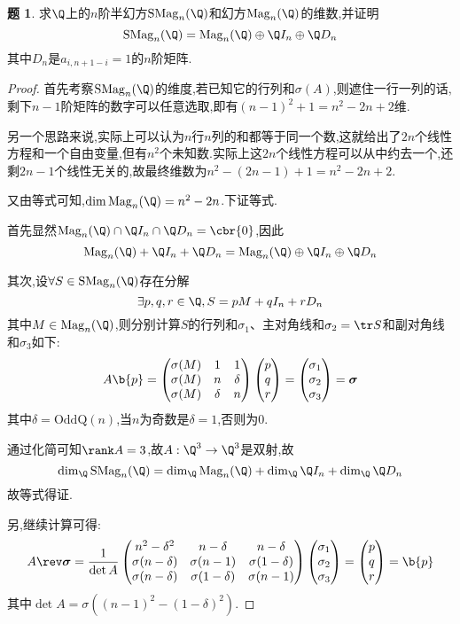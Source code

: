 \documentclass{article}
\newcommand{\Mag}{\mathrm{Mag}}
\newcommand{\SMag}{\mathrm{SMag}}
\theoremstyle{definition}
\newtheorem{exercise}{题}[section]
\begin{document}
\begin{exercise}
    求$\Q$上的$n$阶半幻方$\SMag_n(\Q)$和幻方$\Mag_n(\Q)$的维数,并证明$$\SMag_n(\Q)=\Mag_n(\Q)\oplus \Q I_n\oplus \Q D_n$$其中$D_n$是$a_{i,n+1-i}=1$的$n$阶矩阵.
\end{exercise}
\begin{proof}
    首先考察$\SMag_n(\Q)$的维度,若已知它的行列和$\sigma(A)$,则遮住一行一列的话,剩下$n-1$阶矩阵的数字可以任意选取,即有$(n-1)^2+1=n^2-2n+2$维.

    另一个思路来说,实际上可以认为$n$行$n$列的和都等于同一个数,这就给出了$2n$个线性方程和一个自由变量,但有$n^2$个未知数.实际上这$2n$个线性方程可以从中约去一个,还剩$2n-1$个线性无关的,故最终维数为$n^2-(2n-1)+1=n^2-2n+2$.

    又由等式可知,$\dim \Mag_n(\Q)=n^2-2n$.下证等式.

    首先显然$\Mag_n(\Q)\cap \Q I_n\cap \Q D_n=\cbr{0}$,因此$$\Mag_n(\Q)+ \Q I_n+ \Q D_n=\Mag_n(\Q)\oplus \Q I_n\oplus \Q D_n$$

    其次,设$\forall S\in \SMag_n(\Q)$存在分解$$\exists p,q,r\in \Q, S=pM+qI_n+rD_n$$其中$M\in \Mag_n(\Q)$,则分别计算$S$的行列和$\sigma_1$、主对角线和$\sigma_2=\tr S$和副对角线和$\sigma_3$如下:
    $$A\b{p}=\begin{pmatrix}
       \sigma(M)&1&1\\ \sigma(M)&n&\delta\\ \sigma(M)& \delta &n
    \end{pmatrix}\begin{pmatrix}
       p\\ q\\ r
    \end{pmatrix}=\begin{pmatrix}
       \sigma_1\\ \sigma_2\\ \sigma_3
    \end{pmatrix}=\bm{\sigma}$$
    其中$\delta=\mathrm{OddQ}(n)$,当$n$为奇数是$\delta=1$,否则为$0$.

    通过化简可知$\rank A=3$,故$A:\Q^3\to \Q^3$是双射,故
    $$\dim_\Q \SMag_n(\Q)=\dim_\Q \Mag_n(\Q)+ \dim_\Q \Q I_n + \dim_\Q \Q D_n$$
    故等式得证.

    另,继续计算可得:
    $$A\rev\bm{\sigma}=\frac{1}{\det A}\begin{pmatrix}
       n^2-\delta^2&n-\delta&n-\delta\\ 
       \sigma(n-\delta)&\sigma(n-1)&\sigma(1-\delta)\\
       \sigma(n-\delta)&\sigma(1-\delta)&\sigma(n-1)\\
    \end{pmatrix}\begin{pmatrix}
       \sigma_1\\ \sigma_2\\ \sigma_3
    \end{pmatrix}=\begin{pmatrix}
       p\\ q\\ r
    \end{pmatrix}=\b{p}$$
    其中$\det A=\sigma\left((n-1)^2-(1-\delta)^2\right)$.
    

\end{proof}
\end{document}
